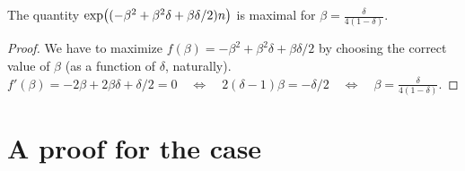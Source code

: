 \begin{lemma}
    The quantity $\exp\pth{( -\beta^2 +\beta^2 \delta + \beta
          \delta /2 ) n }$ is maximal for $ \beta =
    \frac{\delta}{4(1-\delta)}$.
\end{lemma}

\begin{proof}
    We have to maximize $f(\beta) = -\beta^2 +\beta^2 \delta + \beta
    \delta /2$ by choosing the correct value of $\beta$ (as a function
    of $\delta$, naturally).
    \begin{math}
        f'(\beta) = -2 \beta +2\beta \delta + \delta/2 = 0%
        \quad\iff\quad 2(\delta-1)\beta = - \delta/2 \quad\iff\quad
        \beta = \frac{\delta}{4(1-\delta)}.
    \end{math}
\end{proof}





\section{A proof for the  case}

